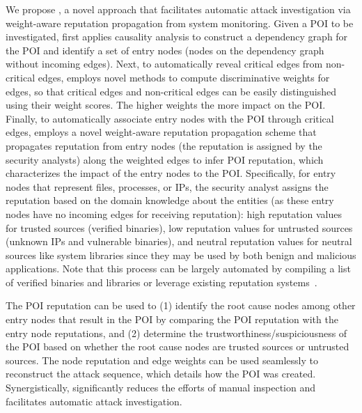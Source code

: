 We propose \tool, a novel approach that facilitates automatic attack investigation via weight-aware reputation propagation from system monitoring.
%
Given a POI to be investigated, \tool first applies causality analysis to construct a dependency graph for the POI and identify a set of entry nodes (\ie nodes on the dependency graph without incoming edges).
Next, to automatically reveal critical edges from non-critical edges, \tool employs novel methods to compute discriminative weights for edges, so that critical edges and non-critical edges can be easily distinguished using their weight scores.
The higher weights the more impact on the POI.
Finally, to automatically associate entry nodes with the POI through critical edges, \tool employs a novel weight-aware reputation propagation scheme that propagates reputation from entry nodes (the reputation is assigned by the security analysts) along the weighted edges to infer POI reputation, which characterizes the impact of the entry nodes to the POI.
Specifically, for entry nodes that represent files, processes, or IPs, the security analyst assigns the reputation based on the domain knowledge about the entities (as these entry nodes have no incoming edges for receiving reputation): high reputation values for trusted sources (\eg verified binaries), low reputation values for 
untrusted sources (\eg unknown IPs and vulnerable binaries), and neutral reputation values for neutral sources like system libraries since they may be used by both benign and malicious applications.
Note that this process can be largely automated by compiling a list of verified binaries and libraries or leverage existing reputation systems~\cite{ipreputation1,ipreputation2}.


The POI reputation can be used to (1) identify the root cause nodes among other entry nodes that result in the POI by comparing the POI reputation with the entry node reputations, and (2) determine the trustworthiness/suspiciousness of the POI based on whether the root cause nodes are trusted sources
or untrusted sources.
The node reputation and edge weights can be used seamlessly to reconstruct the attack sequence, which details how the POI was created.
%
Synergistically, \tool significantly reduces the efforts of manual inspection and facilitates automatic attack investigation.



